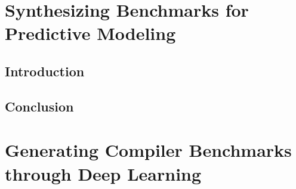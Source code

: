 \ifstapled
\chapter{Synthesizing Benchmarks for Predictive Modeling}
\section{Introduction}
\lipsum[1-2]

\section{Conclusion}
\lipsum[1-2]
\else
\chapter{Generating Compiler Benchmarks through Deep Learning}









\fi